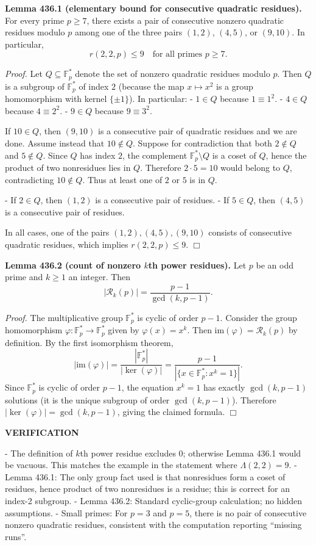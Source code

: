 \medskip
\noindent\textbf{Lemma 436.1 (elementary bound for consecutive quadratic residues).}
For every prime $p\ge 7$, there exists a pair of consecutive nonzero quadratic residues modulo $p$ among one of the three pairs $(1,2)$, $(4,5)$, or $(9,10)$. In particular,
\[
r(2,2,p)\le 9\quad\text{for all primes }p\ge 7.
\]

\noindent\emph{Proof.}
Let $Q\subseteq\mathbb F_p^*$ denote the set of nonzero quadratic residues modulo $p$.
Then $Q$ is a subgroup of $\mathbb F_p^*$ of index $2$ (because the map $x\mapsto x^2$ is a group homomorphism with kernel $\{\pm 1\}$).
In particular:
- $1\in Q$ because $1\equiv 1^2$.
- $4\in Q$ because $4\equiv 2^2$.
- $9\in Q$ because $9\equiv 3^2$.

If $10\in Q$, then $(9,10)$ is a consecutive pair of quadratic residues and we are done.
Assume instead that $10\notin Q$.
Suppose for contradiction that both $2\notin Q$ and $5\notin Q$. Since $Q$ has index $2$, the complement $\mathbb F_p^*\setminus Q$ is a coset of $Q$, hence the product of two nonresidues lies in $Q$.
Therefore $2\cdot 5=10$ would belong to $Q$, contradicting $10\notin Q$.
Thus at least one of $2$ or $5$ is in $Q$.

- If $2\in Q$, then $(1,2)$ is a consecutive pair of residues.
- If $5\in Q$, then $(4,5)$ is a consecutive pair of residues.

In all cases, one of the pairs $(1,2),(4,5),(9,10)$ consists of consecutive quadratic residues, which implies $r(2,2,p)\le 9$. \hfill$\Box$

\medskip
\noindent\textbf{Lemma 436.2 (count of nonzero $k$th power residues).}
Let $p$ be an odd prime and $k\ge 1$ an integer. Then
\[
|\mathcal R_k(p)| = \frac{p-1}{\gcd(k,p-1)}.
\]

\noindent\emph{Proof.}
The multiplicative group $\mathbb F_p^*$ is cyclic of order $p-1$.
Consider the group homomorphism $\varphi:\mathbb F_p^*\to\mathbb F_p^*$ given by $\varphi(x)=x^k$.
Then $\mathrm{im}(\varphi)=\mathcal R_k(p)$ by definition.
By the first isomorphism theorem,
\[|\mathrm{im}(\varphi)| = \frac{|\mathbb F_p^*|}{|\ker(\varphi)|} = \frac{p-1}{|\{x\in\mathbb F_p^*: x^k=1\}|}.
\]
Since $\mathbb F_p^*$ is cyclic of order $p-1$, the equation $x^k=1$ has exactly $\gcd(k,p-1)$ solutions (it is the unique subgroup of order $\gcd(k,p-1)$). Therefore $|\ker(\varphi)|=\gcd(k,p-1)$, giving the claimed formula. \hfill$\Box$

\medskip
\noindent\textbf{VERIFICATION}

- The definition of $k$th power residue excludes $0$; otherwise Lemma 436.1 would be vacuous. This matches the example in the statement where $\Lambda(2,2)=9$.
- Lemma 436.1: The only group fact used is that nonresidues form a coset of residues, hence product of two nonresidues is a residue; this is correct for an index-2 subgroup.
- Lemma 436.2: Standard cyclic-group calculation; no hidden assumptions.
- Small primes: For $p=3$ and $p=5$, there is no pair of consecutive nonzero quadratic residues, consistent with the computation reporting ``missing runs''.

